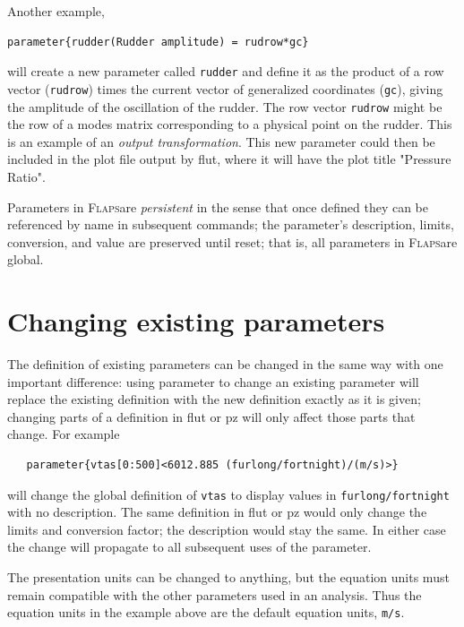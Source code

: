 \documentclass[11pt,openany,twoside]{book}
\numberwithin{equation}{section}		%
\newcommand{\Cmd}[1]{{\sf #1}}
\newcommand{\Newterm}[1]{{\em #1}}	%
\newcommand{\Code}[1]{{\small\tt #1}}
\newcommand{\Flaps}{\textsc{Flaps\:}}
\begin{document}
Another example,
\begin{lstlisting}
parameter{rudder(Rudder amplitude) = rudrow*gc}
\end{lstlisting}
will create a new parameter called \Code{rudder} and
define it as the product of a row vector (\Code{rudrow}) times
the current vector of generalized coordinates (\Code{gc}), giving the
amplitude of the oscillation of the rudder. The row vector \Code{rudrow}
might be the row of a modes matrix corresponding to a physical point
on the rudder. This is an example of an \Newterm{output transformation}.
This new parameter could then be included in the plot file
output by \Cmd{flut}, where it will have the plot title "Pressure Ratio".
\par
Parameters in \Flaps are \Newterm{persistent} in the
sense that once defined they can be referenced by name in subsequent
commands; the parameter's description, limits, conversion,
and value are preserved until reset; that is, all parameters in
\Flaps are global.

\section{Changing existing parameters}\label{sect:changing-par}
The definition of existing parameters can be changed in the
same way with one important difference: using \Cmd{parameter}
to change an existing parameter will replace the existing
definition with the new definition exactly as it is given;
changing parts of a definition in \Cmd{flut} or \Cmd{pz}
will only affect those parts that change. For example
\begin{lstlisting}
   parameter{vtas[0:500]<6012.885 (furlong/fortnight)/(m/s)>}
\end{lstlisting}
will change the global definition of \Code{vtas} to display
values in \Code{furlong/fortnight} with no description.
The same definition in \Cmd{flut} or \Cmd{pz} would only
change the limits and conversion factor; the description
would stay the same.
In either case the change will propagate to all subsequent
uses of the parameter.

The presentation units can be changed to anything, but the
equation units must remain compatible with the other
parameters used in an analysis. Thus the equation units
in the example above are the default equation units, \Code{m/s}.

\end{document}
